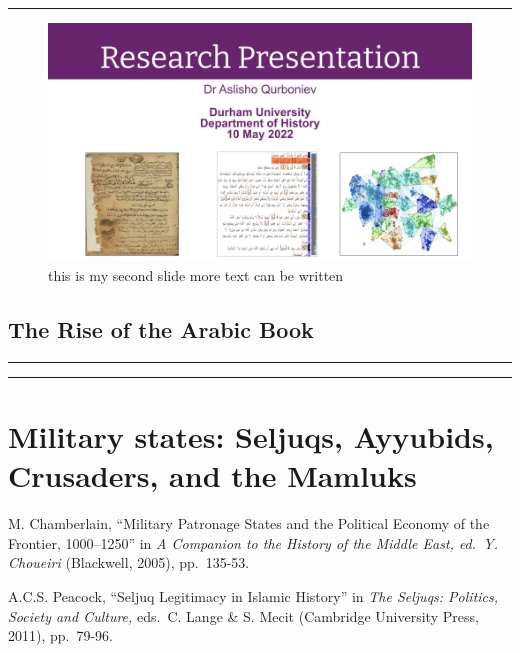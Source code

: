 \documentclass[
]{book}
\begin{document}
\begin{center}\rule{0.5\linewidth}{0.5pt}\end{center}

\begin{figure}
\centering
\includegraphics{./files/slide1.png}
\caption{this is my second slide more text can be written}
\end{figure}

\hypertarget{the-rise-of-the-arabic-book}{%
\section{The Rise of the Arabic Book}\label{the-rise-of-the-arabic-book}}

\begin{center}\rule{0.5\linewidth}{0.5pt}\end{center}

\begin{center}\rule{0.5\linewidth}{0.5pt}\end{center}

\hypertarget{military-states-seljuqs-ayyubids-crusaders-and-the-mamluks}{%
\chapter{Military states: Seljuqs, Ayyubids, Crusaders, and the Mamluks}\label{military-states-seljuqs-ayyubids-crusaders-and-the-mamluks}}

M. Chamberlain, ``Military Patronage States and the Political Economy of the Frontier, 1000--1250'' in \emph{A Companion to the History of the Middle East, ed.~Y. Choueiri} (Blackwell, 2005), pp.~135-53.

A.C.S. Peacock, ``Seljuq Legitimacy in Islamic History'' in \emph{The Seljuqs: Politics, Society and Culture,} eds.~C. Lange \& S. Mecit (Cambridge University Press, 2011), pp.~79-96.
\end{document}
